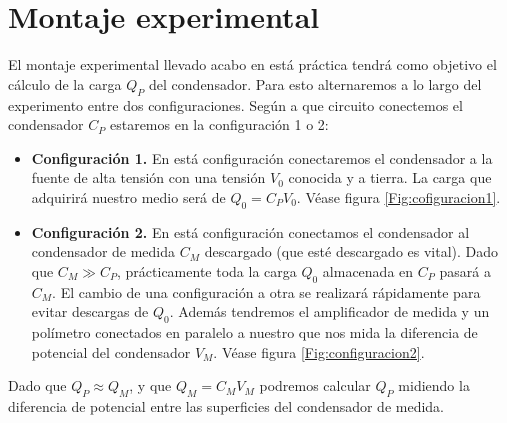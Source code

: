 \documentclass[12pt,a4paper]{article}
\begin{document}
\section{Montaje experimental}

El montaje experimental llevado acabo en está práctica tendrá como objetivo el cálculo de la carga $Q_P$ del condensador. Para esto alternaremos a lo largo del experimento entre dos configuraciones. Según a que circuito conectemos el condensador $C_P$ estaremos en la configuración 1 o 2:

\begin{itemize}
\item \textbf{Configuración 1.} En está configuración conectaremos el condensador a la fuente de alta tensión con una tensión $V_0$ conocida y a tierra. La carga que adquirirá nuestro medio será de $Q_0 = C_P V_0$. Véase figura \ref{Fig:cofiguracion1}.

\item \textbf{Configuración 2.} En está configuración conectamos el condensador al condensador de medida $C_M$ descargado (que esté descargado es vital). Dado que $C_M \gg C_P$, prácticamente toda la carga $Q_0$ almacenada en $C_P$ pasará a $C_M$. El cambio de una configuración a otra se realizará rápidamente para evitar descargas de $Q_0$. Además tendremos el amplificador de medida y un polímetro conectados en paralelo a nuestro que nos mida la diferencia de potencial del condensador $V_M$. Véase figura \ref{Fig:configuracion2}.
\end{itemize}

Dado que $Q_P \approx Q_M$, y que $Q_M = C_M V_M$ podremos calcular $Q_P$ midiendo la diferencia de potencial entre las superficies del condensador de medida.

\newpage
\end{document}
